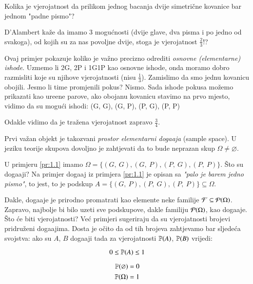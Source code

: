 \begin{pr}[D'Alambert 1754] \label{pr:1.1}
    Kolika je vjerojatnost da prilikom jednog bacanja dvije simetri\v cne kovanice bar jednom "padne pismo"?

    D'Alambert ka\v ze da imamo 3 mogu\' cnosti (dvije glave,
    dva pisma i po jedno od svakoga), od kojih su za nas povoljne
    dvije, stoga je vjerojatnost $\frac{2}{3}$!?
    
    Ovaj primjer pokazuje koliko je va\v zno precizno odrediti \emph{osnovne (elementarne) ishode}.
    Uzmemo li 2G, 2P i 1G1P kao osnovne ishode, onda moramo dobro razmisliti koje su njihove vjerojatnosti (nisu $\frac{1}{3}$). Zamislimo da smo jednu kovanicu obojili.
    Jesmo li time promjenili pokus?
    Nismo.
    Sada ishode pokusa mo\v zemo prikazati kao ure\dj ene parove, ako obojanu kovanicu stavimo na prvo mjesto, vidimo da su mogu\' ci ishodi:
    (G, G), (G, P), (P, G), (P, P)
    
    Odakle vidimo da je tra\v zena vjerojatnost zapravo $\frac{3}{4}$.
\end{pr}

Prvi va\v zan objekt je takozvani \emph{prostor elementarni doga\dj aja} (sample space).
U jeziku teorije skupova dovoljno je zahtjevati da to bude neprazan skup $\Omega \neq \varnothing$.

U primjeru \ref{pr:1.1} imamo $ \Omega = \{(G, \: G), (G, \: P), (P, \: G), (P, \: P)\}$.
\v Sto su doga\dj aji?
Na primjer doga\dj aj iz primjera \ref{pr:1.1} je opisan sa \emph{"palo je barem jedno pismo"}, to jest, to je podskup $A = \{(G, \: P),(P, \: G), (P, \: P)\} \subseteq \Omega$.

Dakle, doga\dj aje je prirodno promatrati kao elemente neke familije $\mathcal{F} \subseteq \mathcal{P}({\Omega})$.
Zapravo, najbolje bi bilo uzeti sve podskupove, dakle familiju $\mathcal{P}({\Omega})$, kao doga\dj aje.
\v Sto \' ce biti vjerojatnosti?
Ve\' c primjeri sugeriraju da su vjerojatnosti brojevi pridru\v zeni doga\dj ajima.
Dosta je o\v cito da od tih brojeva zahtjevamo bar sljede\' ca svojstva: ako su $A$, $B$ doga\dj aji tada za vjerojatnosti $\mathbb{P}({A})$, $\mathbb{P}({B})$ vrijedi:

\begin{equation} \label{jed:1.2}
    0 \leq \mathbb{P}({A}) \leq 1
\end{equation}

\begin{align} \label{jed:1.3}
    \begin{split}
        \mathbb{P}({\varnothing}) &= 0 \\
        \mathbb{P}({\Omega}) &= 1
    \end{split}
\end{align}

